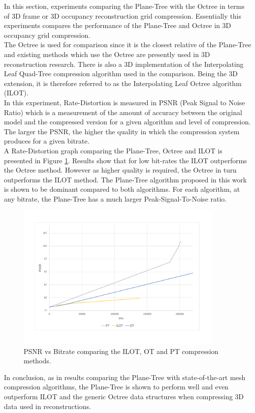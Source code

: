 
In this section, experiments comparing the Plane-Tree with the Octree in terms of 3D frame or 3D occupancy reconstruction grid compression. Essentially this experiments compares the performance of the Plane-Tree and Octree in 3D occupancy grid compression. \\

The Octree is used for comparison since it is the closest relative of the Plane-Tree and existing methods which use the Octree are presently used in 3D reconstruction research. There is also a 3D implementation of the Interpolating Leaf Quad-Tree \cite{Lincoln13Interpolating} compression algorithm used in the comparison. Being the 3D extension, it is therefore referred to as the Interpolating Leaf Octree algorithm (ILOT). \\

In this experiment, Rate-Distortion is measured in PSNR (Peak Signal to Noise Ratio) which is a measurement of the amount of accuracy between the original model and the compressed version for a given algorithm and level of compression. The larger the PSNR, the higher the quality in which the compression system produces for a given bitrate. \\

A Rate-Distortion graph comparing the Plane-Tree, Octree and ILOT is presented in Figure \ref{fig:3DReconCompression1}. Results show that for low bit-rates the ILOT outperforms the Octree method. However as higher quality is required, the Octree in turn outperforms the ILOT method. The Plane-Tree algorithm proposed in this work is shown to be dominant compared to both algorithms. For each algorithm, at any bitrate, the Plane-Tree has a much larger Peak-Signal-To-Noise ratio. \\

\begin{figure}[!htb]
\centering
\includegraphics[width=4.0in]{images/results/compression/psnr1}
\caption{PSNR vs Bitrate comparing the ILOT, OT and PT compression methods.}
\label{fig:3DReconCompression1}
\end{figure}

In conclusion, as in results comparing the Plane-Tree with state-of-the-art mesh compression algorithms, the Plane-Tree is shown to perform well and even outperform ILOT and the generic Octree data structures when compressing 3D data used in reconstructions. 
